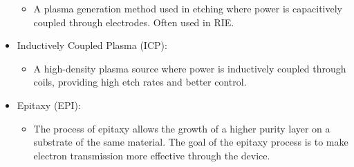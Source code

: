 \documentclass[
]{article}
\providecommand{\tightlist}{%
  \setlength{\itemsep}{0pt}\setlength{\parskip}{0pt}}
\begin{document}
\begin{itemize}
  \begin{itemize}
  \tightlist
  \item
    A plasma generation method used in etching where power is
    capacitively coupled through electrodes. Often used in RIE.
  \end{itemize}
\item
  Inductively Coupled Plasma (ICP):

  \begin{itemize}
  \tightlist
  \item
    A high-density plasma source where power is inductively coupled
    through coils, providing high etch rates and better control.
  \end{itemize}
\item
  Epitaxy (EPI):

  \begin{itemize}
  \tightlist
  \item
    The process of epitaxy allows the growth of a higher purity layer on
    a substrate of the same material. The goal of the epitaxy process is
    to make electron transmission more effective through the device.
  \end{itemize}
\end{itemize}
\end{document}
